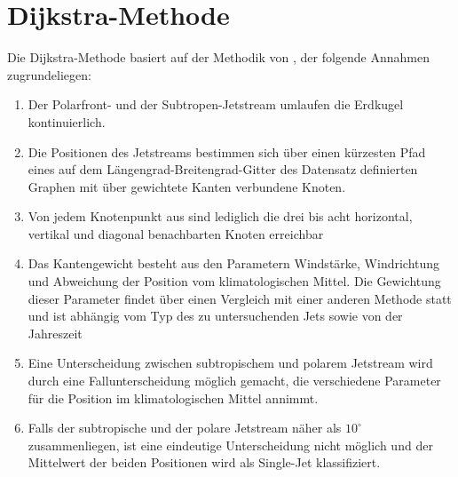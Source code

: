 \section{Dijkstra-Methode}
Die Dijkstra-Methode basiert auf der Methodik von \citet{molnos-2017}, der folgende Annahmen zugrundeliegen:
\begin{enumerate}
  \item Der Polarfront- und der Subtropen-Jetstream umlaufen die Erdkugel kontinuierlich.
  \item Die Positionen des Jetstreams bestimmen sich über einen kürzesten Pfad eines auf dem Längengrad-Breitengrad-Gitter des Datensatz definierten Graphen mit über gewichtete Kanten verbundene Knoten.
  \item Von jedem Knotenpunkt aus sind lediglich die drei bis acht horizontal, vertikal und diagonal benachbarten Knoten erreichbar
  \item Das Kantengewicht besteht aus den Parametern Windstärke, Windrichtung und Abweichung der Position vom klimatologischen Mittel. Die Gewichtung dieser Parameter findet über einen Vergleich mit einer anderen Methode statt und ist abhängig vom Typ des zu untersuchenden Jets sowie von der Jahreszeit
  \item Eine Unterscheidung zwischen subtropischem und polarem Jetstream wird durch eine Fallunterscheidung möglich gemacht, die verschiedene Parameter für die Position im klimatologischen Mittel annimmt.
  \item Falls der subtropische und der polare Jetstream näher als $10^\circ$ zusammenliegen, ist eine eindeutige Unterscheidung nicht möglich und der Mittelwert der beiden Positionen wird als Single-Jet klassifiziert.
\end{enumerate}

